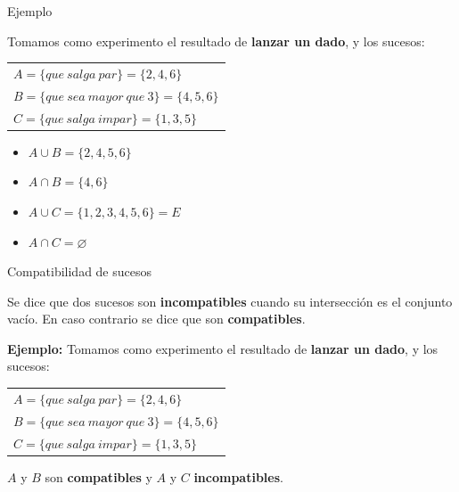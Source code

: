 \documentclass[11pt,handout]{beamer}
\begin{document}
\begin{frame}
{Ejemplo}

 Tomamos como experimento el resultado de \textbf{lanzar un dado}, y los sucesos: \\
\begin{tabular}{l}
$A=\lbrace que\ salga\ par\rbrace=\lbrace2,4,6\rbrace$ \\
$B=\lbrace que\ sea\ mayor\ que\ 3\rbrace=\lbrace4,5,6\rbrace$ \\
$C=\lbrace que\ salga\ impar\rbrace=\lbrace1,3,5\rbrace$
\end{tabular}

\begin{itemize}	[<+->]
	\item $A\cup B=\lbrace2,4,5,6\rbrace$ \\
	\item $A\cap B=\lbrace4,6\rbrace$\\

	\item $A\cup C=\lbrace1,2,3,4,5,6\rbrace=E$
	\item $A\cap C=\varnothing$
\end{itemize}

\end{frame}


\begin{frame}{Compatibilidad de sucesos}
\begin{block}{}
Se dice que dos sucesos son \textbf{incompatibles} cuando su intersección es el conjunto vacío. En caso contrario se dice que son \textbf{compatibles}.
\end{block}
\pause
\textbf{Ejemplo:} Tomamos como experimento el resultado de \textbf{lanzar un dado}, y los sucesos: \\
\begin{tabular}{l}
$A=\lbrace que\ salga\ par\rbrace=\lbrace2,4,6\rbrace$ \\
$B=\lbrace que\ sea\ mayor\ que\ 3\rbrace=\lbrace4,5,6\rbrace$ \\
$C=\lbrace que\ salga\ impar\rbrace=\lbrace1,3,5\rbrace$
\end{tabular}
\newline
$A$ y $B$ son \textbf{compatibles} y $A$ y $C$ \textbf{incompatibles}.

\end{frame}
\end{document}
